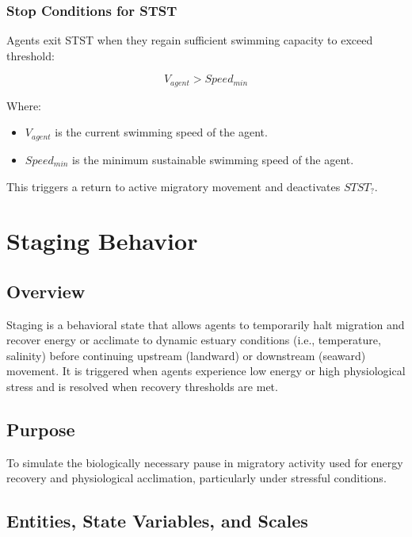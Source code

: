 \documentclass[
]{book}
\begin{document}
\subsection{Stop Conditions for STST}\label{stop-conditions-for-stst}

Agents exit STST when they regain sufficient swimming capacity to exceed threshold:

\[
V_{agent} > Speed_{min}
\]

Where:

\begin{itemize}
\item
  \(V_{agent}\) is the current swimming speed of the agent.
\item
  \(Speed_{min}\) is the minimum sustainable swimming speed of the agent.
\end{itemize}

This triggers a return to active migratory movement and deactivates \(STST_{?}\).

\chapter{Staging Behavior}\label{staging-behavior}

\section{Overview}\label{overview-7}

Staging is a behavioral state that allows agents to temporarily halt migration and recover energy or acclimate to dynamic estuary conditions (i.e., temperature, salinity) before continuing upstream (landward) or downstream (seaward) movement. It is triggered when agents experience low energy or high physiological stress and is resolved when recovery thresholds are met.

\section{Purpose}\label{purpose-6}

To simulate the biologically necessary pause in migratory activity used for energy recovery and physiological acclimation, particularly under stressful conditions.

\section{Entities, State Variables, and Scales}\label{entities-state-variables-and-scales-6}
\end{document}
